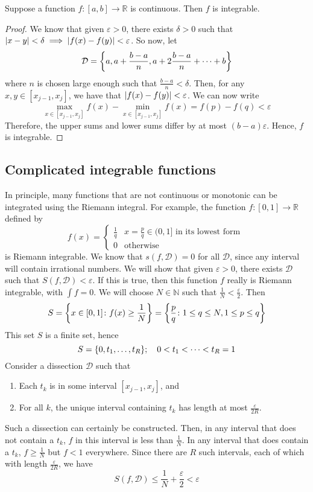 \begin{theorem}
	Suppose a function \(f \colon [a, b] \to \mathbb R\) is continuous.
	Then \(f\) is integrable.
\end{theorem}
\begin{proof}
	We know that given \(\varepsilon > 0\), there exists \(\delta > 0\) such that \(\abs{x - y} < \delta \implies \abs{f(x) - f(y)} < \varepsilon\).
	So now, let
	\[
		\mathcal D = \qty{ a, a + \frac{b-a}{n}, a + 2\frac{b-a}{n} + \dots + b }
	\]
	where \(n\) is chosen large enough such that \(\frac{b-a}{n} < \delta\).
	Then, for any \(x, y \in [x_{j-1}, x_j]\), we have that \(\abs{f(x) - f(y)} < \varepsilon\).
	We can now write
	\[
		\max_{x \in [x_{j-1}, x_j]} f(x) - \min_{x \in [x_{j-1}, x_j]} f(x) = f(p) - f(q) < \varepsilon
	\]
	Therefore, the upper sums and lower sums differ by at most \((b-a)\varepsilon\).
	Hence, \(f\) is integrable.
\end{proof}

\subsection{Complicated integrable functions}
In principle, many functions that are not continuous or monotonic can be integrated using the Riemann integral.
For example, the function \(f\colon [0, 1] \to \mathbb R\) defined by
\[
	f(x) = \begin{cases}
		\frac{1}{q} & x = \frac{p}{q} \in (0, 1] \text{ in its lowest form } \\
		0           & \text{otherwise}
	\end{cases}
\]
is Riemann integrable.
We know that \(s(f, \mathcal D) = 0\) for all \(\mathcal D\), since any interval will contain irrational numbers.
We will show that given \(\varepsilon > 0\), there exists \(\mathcal D\) such that \(S(f, \mathcal D) < \varepsilon\).
If this is true, then this function \(f\) really is Riemann integrable, with \(\int f = 0\).
We will choose \(N \in \mathbb N\) such that \(\frac{1}{N} < \frac{\varepsilon}{2}\).
Then
\[
	S = \qty{ x \in [0, 1] \colon f(x) \geq \frac{1}{N} } = \qty{ \frac{p}{q} \colon 1 \leq q \leq N, 1 \leq p \leq q }
\]
This set \(S\) is a finite set, hence
\[
	S = \qty{ 0, t_1, \dots, t_R };\quad 0 < t_1 < \dots < t_R = 1
\]
Consider a dissection \(\mathcal D\) such that
\begin{enumerate}[(1)]
	\item Each \(t_k\) is in some interval \([x_{j-1}, x_j]\), and
	\item For all \(k\), the unique interval containing \(t_k\) has length at most \(\frac{\varepsilon}{2R}\).
\end{enumerate}
Such a dissection can certainly be constructed.
Then, in any interval that does not contain a \(t_k\), \(f\) in this interval is less than \(\frac{1}{N}\).
In any interval that does contain a \(t_k\), \(f \geq \frac{1}{N}\) but \(f < 1\) everywhere.
Since there are \(R\) such intervals, each of which with length \(\frac{\varepsilon}{2R}\), we have
\[
	S(f, \mathcal D) \leq \frac{1}{N} + \frac{\varepsilon}{2} < \varepsilon
\]

